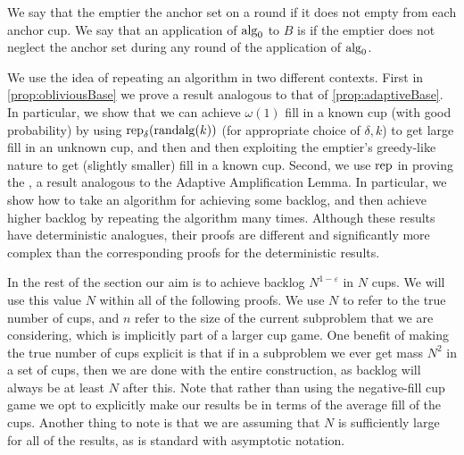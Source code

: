 \begin{definition}
{\normalfont
We say that the emptier  the anchor set on a round
if it does not empty from each anchor cup. We say that an
application of $\operatorname{\text{\textup{alg}}}_0$ to $B$ is  if
the emptier does not neglect the anchor set during any round of
the application of $\operatorname{\text{\textup{alg}}}_0$.
}
\end{definition}

We use the idea of repeating an algorithm in two different
contexts. First in \cref{prop:obliviousBase} we prove a result
analogous to that of \cref{prop:adaptiveBase}. In particular, we
show that we can achieve $\omega(1)$ fill in a known cup (with
good probability) by using $\operatorname{\text{\textup{rep}}}_{\delta}(\operatorname{\text{\textup{randalg}}}(k))$ (for
appropriate choice of $\delta, k$) to get large fill in an
unknown cup, and then and then exploiting the emptier's
greedy-like nature to get (slightly smaller) fill in a known cup.
Second, we use $\operatorname{\text{\textup{rep}}}$ in proving the , a result analogous to the Adaptive
Amplification Lemma. In particular, we show how to take an
algorithm for achieving some backlog, and then achieve higher
backlog by repeating the algorithm many times. Although these
results have deterministic analogues, their proofs are different
and significantly more complex than the corresponding proofs for
the deterministic results.

In the rest of the section our aim is to achieve backlog
$N^{1-\varepsilon}$ in $N$ cups. We will use this value $N$
within all of the following proofs. We use $N$ to refer to the
true number of cups, and $n$ refer to the size of the current
subproblem that we are considering, which is implicitly part of a
larger cup game. One benefit of making the true number of cups
explicit is that if in a subproblem we ever get mass $N^2$ in a
set of cups, then we are done with the entire construction, as
backlog will always be at least $N$ after this. Note that rather
than using the negative-fill cup game we opt to explicitly make
our results be in terms of the average fill of the cups. Another
thing to note is that we are assuming that $N$ is sufficiently
large for all of the results, as is standard with asymptotic
notation.

